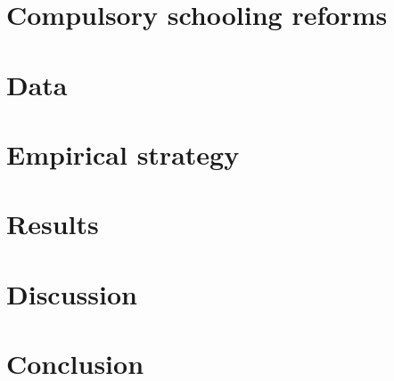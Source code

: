 \documentclass[11pt, a4paper, leqno]{article}
\begin{document}
\section{Compulsory schooling reforms} \label{sec:reforms}


\section{Data} \label{sec:data}



\section{Empirical strategy} \label{sec:emp_strategy}


\section{Results} \label{sec:results}


\section{Discussion} \label{sec:discussion}



\section{Conclusion} \label{sec:conclusion}


\printbibliography
{}


\appendix

\end{document}
